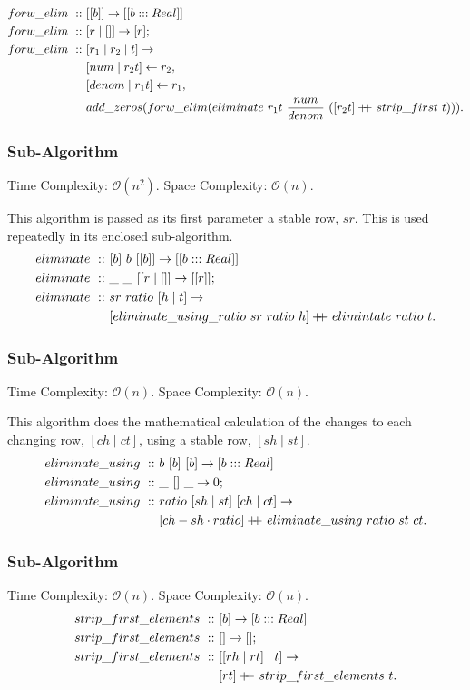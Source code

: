 \documentclass[a4paper,10pt]{book}
\newcommand\doubleplus{+\kern-1.3ex+\kern0.8ex}
\begin{document}
\begin{align*}
forw\_elim\ ::\ &[[b]]\rightarrow [[b:::Real]]\\
forw\_elim\ ::\ &[r\mid []]\rightarrow [r];\\
forw\_elim\ ::\ &[r_1\mid r_2\mid t]\rightarrow\\
	&[num\mid r_2t]\leftarrow r_2,\\
	&[denom\mid r_1t]\leftarrow r_1,\\
	&add\_zeros (forw\_elim (eliminate\ r_1t\ \frac{num}{denom}\ ([r_2t]\doubleplus strip\_first\ t))).
\end{align*}


\subsubsection{Sub-Algorithm}Time Complexity: $\mathcal{O}(n^2)$. Space Complexity: $\mathcal{O}(n)$.

This algorithm is passed as its first parameter a stable row, $sr$. This is used repeatedly in its enclosed sub-algorithm.
\begin{align*}
eliminate\ ::\ &[b]\ b\ [[b]]\rightarrow[[b:::Real]]\\
eliminate\ ::\ &\_\ \_\ [[r\mid []]\rightarrow [[r]];\\
eliminate\ ::\ &sr\ ratio\ [h\mid t]\rightarrow\\
	&[eliminate\_using\_ratio\ sr\ ratio\ h]\doubleplus elimintate\ ratio\ t.
\end{align*}

\subsubsection{Sub-Algorithm}Time Complexity: $\mathcal{O}(n)$. Space Complexity: $\mathcal{O}(n)$.

This algorithm does the mathematical calculation of the changes to each changing row, $[ch\mid ct]$, using a stable row, $[sh\mid st]$.
\begin{align*}
eliminate\_using\ ::\ &b\ [b]\ [b]\rightarrow [b:::Real]\\
eliminate\_using\ ::\ &\_\ []\ \_\rightarrow 0;\\
eliminate\_using\ ::\ &ratio\ [sh\mid st]\ [ch\mid ct]\rightarrow\\
	&[ch-sh\cdot ratio]\doubleplus eliminate\_using\ ratio\ st\ ct.
\end{align*}

\subsubsection{Sub-Algorithm}Time Complexity: $\mathcal{O}(n)$. Space Complexity: $\mathcal{O}(n)$.
\begin{align*}
strip\_first\_elements\ ::\ &[b]\rightarrow [b:::Real]\\
strip\_first\_elements\ ::\ &[]\rightarrow [];\\
strip\_first\_elements\ ::\ &[[rh\mid rt]\mid t]\rightarrow\\
	&[rt]\doubleplus strip\_first\_elements\ t.
\end{align*}
\end{document}
